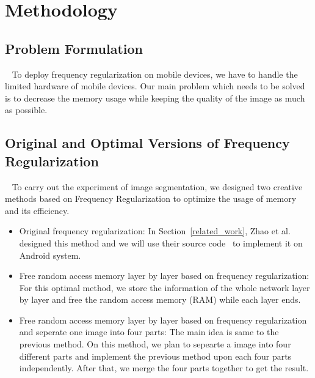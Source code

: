 \documentclass[runningheads]{llncs}
\begin{document}
\section{Methodology}\label{methodology}
\subsection{Problem Formulation}~\label{formulation}
To deploy frequency regularization on mobile devices, we have to handle the limited hardware of mobile devices. Our main problem which needs to be solved is to decrease the memory usage while keeping the quality of the image as much as possible.

\subsection{Original and Optimal Versions of Frequency Regularization}~\label{optimal}
To carry out the experiment of image segmentation, we designed two creative methods based on Frequency Regularization to optimize the usage of memory and its efficiency. 
\begin{itemize}
	\item Original frequency regularization: In Section~\ref{related_work}, Zhao et al. designed this method and we will use their source code~\cite{fr_repo} to implement it on Android system.
	\item Free random access memory layer by layer based on frequency regularization: For this optimal method, we store the information of the whole network layer by layer and free the random access memory (RAM) while each layer ends. 
	\item Free random access memory layer by layer based on frequency regularization and seperate one image into four parts: The main idea is same to the previous method. On this method, we plan to sepearte a image into four different parts and implement the previous method upon each four parts independently. After that, we merge the four parts together to get the result. 
\end{itemize}	 		
\end{document}

